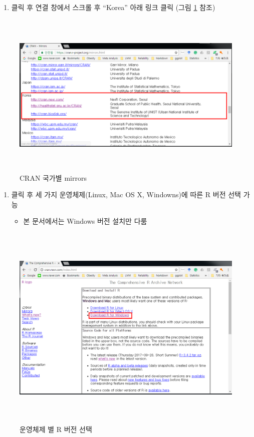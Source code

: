 \documentclass[12pt,a4paper]{book}
\providecommand{\tightlist}{%
  \setlength{\itemsep}{0pt}\setlength{\parskip}{0pt}}
\begin{document}
\begin{enumerate}
\def\labelenumi{\arabic{enumi}.}
\setcounter{enumi}{2}
\tightlist
\item
  클릭 후 연결 창에서 스크롤 후 ``Korea'' 아래 링크 클릭 (그림
  \ref{fig:R-install-02} 참조)
\end{enumerate}

\begin{figure}[h]
{
  \centering
  \includegraphics[width = 12cm, height = 8cm]{Figures/CRAN-korea-01.PNG}
  \caption[CRAN 국가별 mirrors]{CRAN 국가별 mirrors}\label{fig:R-install-02}
}
\end{figure}

\begin{enumerate}
\def\labelenumi{\arabic{enumi}.}
\setcounter{enumi}{3}
\tightlist
\item
  클릭 후 세 가지 운영체제(Linux, Mac OS X, Windowns)에 따른 R 버전 선택
  가능

  \begin{itemize}
  \tightlist
  \item
    본 문서에서는 Windows 버전 설치만 다룸
  \end{itemize}
\end{enumerate}

\begin{figure}[h]
{
  \centering
  \includegraphics[width = 12cm, height = 10cm]{Figures/Rinstall-01.png}
  \caption[운영체제 별 R 버전 선택]{운영체제 별 R 버전 선택}\label{fig:R-install-03}
}
\end{figure}
\end{document}
